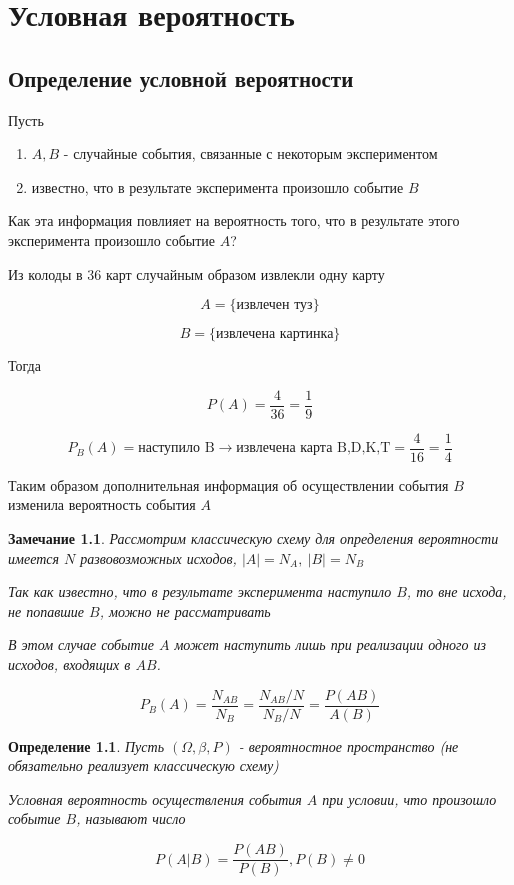 \documentclass[a4paper, 14pt]{report}
\newtheorem{defenition}{Определение}[chapter]
\newtheorem{note}{Замечание}[chapter]
\begin{document}
\chapter{Условная вероятность}

\section{Определение условной вероятности}

Пусть 

\begin{enumerate}
    \item $A, B$ - случайные события, связанные с некоторым экспериментом
    \item известно, что в результате эксперимента произошло событие $B$ 
\end{enumerate}

Как эта информация повлияет на вероятность того, что в результате этого эксперимента произошло событие $A$?

Из колоды в 36 карт случайным образом извлекли одну карту

$$
A = \{ \text{извлечен туз} \}
$$

$$
B = \{ \text{извлечена картинка} \}
$$

Тогда

$$
P(A) = \frac{4}{36} = \frac{1}{9}
$$

$$
P_B(A) = \text{наступило B} \to \text{извлечена карта B,D,K,T} = \frac{4}{16} = \frac{1}{4}
$$

Таким образом дополнительная информация об осуществлении события $B$ изменила вероятность события $A$

\begin{note}
    Рассмотрим классическую схему для определения вероятности имеется $N$ развовозможных исходов, $|A| = N_A,\ |B| = N_B$

    Так как известно, что в результате эксперимента наступило $B$, то вне исхода, не попавшие $B$, можно не рассматривать

    В этом случае событие $A$ может наступить лишь при реализации одного из исходов, входящих в $AB$.

    $$
    P_B(A) = \frac{N_{AB}}{N_B} = \frac{N_{AB} / N}{N_B / N} = \frac{P(AB)}{A(B)}
    $$
\end{note}

\begin{defenition}
    Пусть $(\Omega, \beta, P)$ - вероятностное пространство (не обязательно реализует классическую схему)

    Условная вероятность осуществления события $A$ при условии, что произошло событие $B$, называют число

    $$
    P(A|B) = \frac{P(AB)}{P(B)}, P(B) \ne 0
    $$
\end{defenition}
\end{document}

